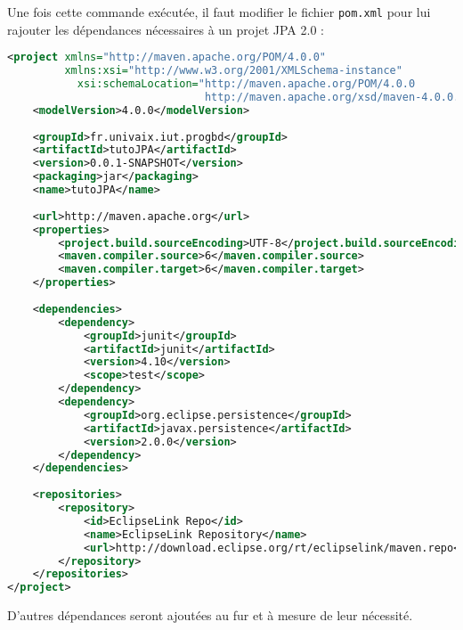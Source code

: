 \documentclass[a4paper,11pt]{article}
\begin{document}
Une fois cette commande exécutée, il faut modifier le fichier \texttt{pom.xml} pour lui rajouter les dépendances 
nécessaires à un projet JPA 2.0 :
\begin{lstlisting}[language=XML,style=customxml]
<project xmlns="http://maven.apache.org/POM/4.0.0" 
         xmlns:xsi="http://www.w3.org/2001/XMLSchema-instance"
	       xsi:schemaLocation="http://maven.apache.org/POM/4.0.0 
	                           http://maven.apache.org/xsd/maven-4.0.0.xsd">
	<modelVersion>4.0.0</modelVersion>
	
	<groupId>fr.univaix.iut.progbd</groupId>
	<artifactId>tutoJPA</artifactId>
	<version>0.0.1-SNAPSHOT</version>
	<packaging>jar</packaging>
	<name>tutoJPA</name>
	
	<url>http://maven.apache.org</url>
	<properties>
		<project.build.sourceEncoding>UTF-8</project.build.sourceEncoding>
		<maven.compiler.source>6</maven.compiler.source>
		<maven.compiler.target>6</maven.compiler.target>
	</properties>
	
	<dependencies>
		<dependency>
			<groupId>junit</groupId>
			<artifactId>junit</artifactId>
			<version>4.10</version>
			<scope>test</scope>
		</dependency>
		<dependency>
			<groupId>org.eclipse.persistence</groupId>
			<artifactId>javax.persistence</artifactId>
			<version>2.0.0</version>
		</dependency>
	</dependencies>
	
	<repositories>
		<repository>
			<id>EclipseLink Repo</id>
			<name>EclipseLink Repository</name>
			<url>http://download.eclipse.org/rt/eclipselink/maven.repo</url>
		</repository>
	</repositories>
</project>
\end{lstlisting}
D'autres dépendances seront ajoutées au fur et à mesure de leur nécessité.
\end{document}

